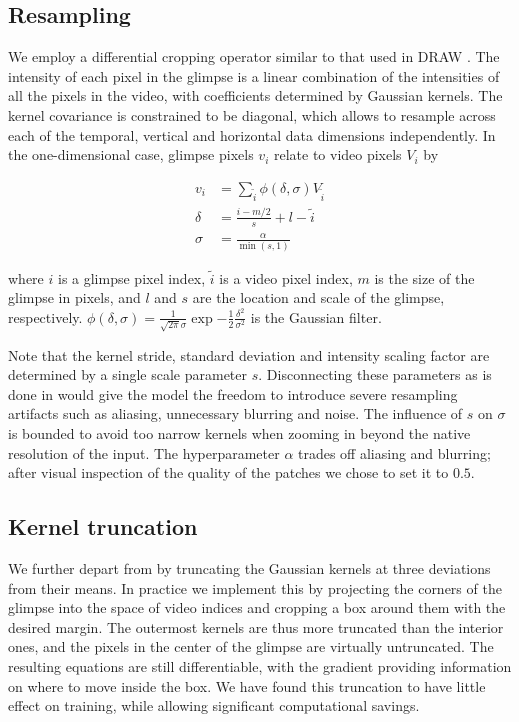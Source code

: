 \documentclass{article} %
\begin{document}
\subsection{Resampling}
\label{sec:resampling}

We employ a differential cropping operator similar to that used in DRAW \cite{draw}.
The intensity of each pixel in the glimpse is a linear combination of the intensities of all the pixels in the video, with coefficients determined by Gaussian kernels.
The kernel covariance is constrained to be diagonal, which allows to resample across each of the temporal, vertical and horizontal data dimensions independently.
In the one-dimensional case, glimpse pixels $v_i$ relate to video pixels $V_i$ by

\begin{equation}
\begin{split}
v_i &= \sum_{\tilde{i}} \phi(\delta,\sigma) V_{\tilde{i}} \\
\delta & =  \frac{i - m/2}{s} + l - \tilde{i} \\
\sigma & =  \frac{\alpha}{\min(s, 1)}
\end{split}
\end{equation}

where $i$ is a glimpse pixel index, $\tilde{i}$ is a video pixel index, $m$ is the size of the glimpse in pixels, and $l$ and $s$ are the location and scale of the glimpse, respectively.
$\phi( \delta, \sigma ) = \frac{1}{\sqrt{2 \pi}\sigma} \exp{- \frac{1}{2} \frac{\delta^2}{\sigma^2}}$ is the Gaussian filter.

Note that the kernel stride, standard deviation and intensity scaling factor are determined by a single scale parameter $s$.
Disconnecting these parameters as is done in \cite{draw} would give the model the freedom to introduce severe resampling artifacts such as aliasing, unnecessary blurring and noise.
The influence of $s$ on $\sigma$ is bounded to avoid too narrow kernels when zooming in beyond the native resolution of the input.
The hyperparameter $\alpha$ trades off aliasing and blurring; after visual inspection of the quality of the patches we chose to set it to $0.5$.

\subsection{Kernel truncation}

We further depart from \cite{draw} by truncating the Gaussian kernels at three deviations from their means.
In practice we implement this by projecting the corners of the glimpse into the space of video indices and cropping a box around them with the desired margin.
The outermost kernels are thus more truncated than the interior ones, and the pixels in the center of the glimpse are virtually untruncated.
The resulting equations are still differentiable, with the gradient providing information on where to move inside the box.
We have found this truncation to have little effect on training, while allowing significant computational savings.
\end{document}
